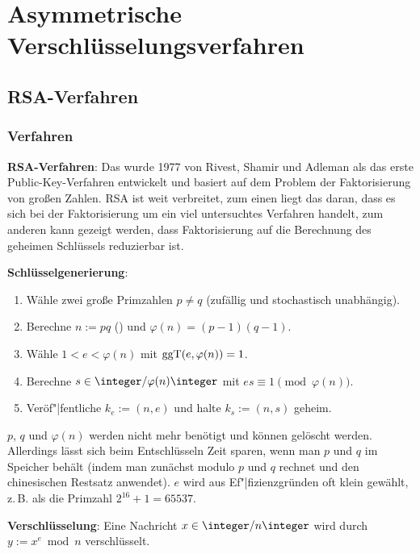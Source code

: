\chapter{%
    Asymmetrische Verschlüsselungsverfahren%
}

\section{%
    RSA-Verfahren%
}

\subsection{%
    Verfahren%
}

\textbf{RSA-Verfahren}:
Das  wurde 1977 von Rivest, Shamir und Adleman als das erste
Public-Key-Verfahren entwickelt und basiert auf dem Problem der Faktorisierung von großen Zahlen.
RSA ist weit verbreitet, zum einen liegt das daran, dass es sich bei der Faktorisierung
um ein viel untersuchtes Verfahren handelt, zum anderen kann gezeigt werden,
dass Faktorisierung auf die Berechnung des geheimen Schlüssels reduzierbar ist.

\textbf{Schlüsselgenerierung}:
\begin{enumerate}
    \item
    Wähle zwei große Primzahlen $p \not= q$ (zufällig und stochastisch unabhängig).

    \item
    Berechne $n := pq$ () und $\varphi(n) = (p - 1)(q - 1)$.

    \item
    Wähle $1 < e < \varphi(n)$ mit $\operatorname{ggT}(e, \varphi(n)) = 1$.

    \item
    Berechne $s \in \integer/\varphi(n)\integer$ mit $es \equiv 1 \pmod{\varphi(n)}$.

    \item
    Veröf"|fentliche $k_e := (n, e)$ und halte $k_s := (n, s)$ geheim.
\end{enumerate}
$p$, $q$ und $\varphi(n)$ werden nicht mehr benötigt und können gelöscht werden.
Allerdings lässt sich beim Entschlüsseln Zeit sparen, wenn man $p$ und $q$ im Speicher behält
(indem man zunächst modulo $p$ und $q$ rechnet und den chinesischen Restsatz anwendet).
$e$ wird aus Ef"|fizienzgründen oft klein gewählt, z.\,B. als die Primzahl $2^{16} + 1 = 65537$.

\textbf{Verschlüsselung}:
Eine Nachricht $x \in \ZnZ$ wird durch $y := x^e \bmod n$ verschlüsselt.

